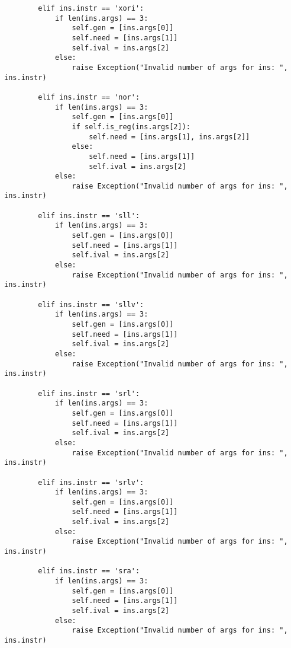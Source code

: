 \begin{lstlisting}
        elif ins.instr == 'xori': 
            if len(ins.args) == 3:
                self.gen = [ins.args[0]]
                self.need = [ins.args[1]]
                self.ival = ins.args[2]
            else:
                raise Exception("Invalid number of args for ins: ", ins.instr)           
                
        elif ins.instr == 'nor':  
            if len(ins.args) == 3:
                self.gen = [ins.args[0]]
                if self.is_reg(ins.args[2]):
                    self.need = [ins.args[1], ins.args[2]]
                else: 
                    self.need = [ins.args[1]]
                    self.ival = ins.args[2]
            else:
                raise Exception("Invalid number of args for ins: ", ins.instr) 
                                
        elif ins.instr == 'sll':  
            if len(ins.args) == 3:
                self.gen = [ins.args[0]]
                self.need = [ins.args[1]]
                self.ival = ins.args[2]
            else:
                raise Exception("Invalid number of args for ins: ", ins.instr)  
                        
        elif ins.instr == 'sllv': 
            if len(ins.args) == 3:
                self.gen = [ins.args[0]]
                self.need = [ins.args[1]]
                self.ival = ins.args[2]
            else:
                raise Exception("Invalid number of args for ins: ", ins.instr)  
                        
        elif ins.instr == 'srl':  
            if len(ins.args) == 3:
                self.gen = [ins.args[0]]
                self.need = [ins.args[1]]
                self.ival = ins.args[2]
            else:
                raise Exception("Invalid number of args for ins: ", ins.instr)  
                        
        elif ins.instr == 'srlv': 
            if len(ins.args) == 3:
                self.gen = [ins.args[0]]
                self.need = [ins.args[1]]
                self.ival = ins.args[2]
            else:
                raise Exception("Invalid number of args for ins: ", ins.instr)  
                        
        elif ins.instr == 'sra':  
            if len(ins.args) == 3:
                self.gen = [ins.args[0]]
                self.need = [ins.args[1]]
                self.ival = ins.args[2]
            else:
                raise Exception("Invalid number of args for ins: ", ins.instr)  
                        

\end{lstlisting}
